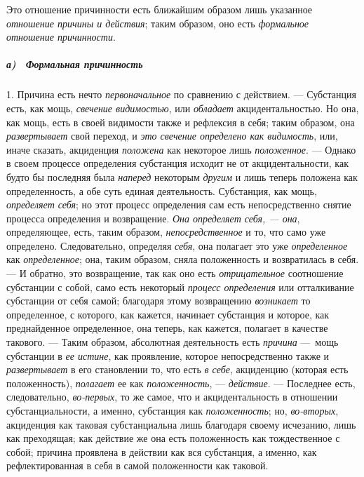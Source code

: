 Это отношение причинности есть ближайшим образом лишь указанное
{\em отношение причины и действия}; таким образом, оно
есть {\em формальное отношение причинности}.

\subparagraph[а) \ Формальная причинность]{а) \ Формальная причинность}
\hypertarget{Toc478978771}{}1. Причина есть нечто
{\em первоначальное} по сравнению с действием. —
Субстанция есть, как мощь, {\em свечение видимостью},
или {\em обладает} акцидентальностью. Но она, как мощь,
есть в своей видимости также и рефлексия в себя; таким образом, она
{\em развертывает} свой переход, и
{\em это свечение определено как видимость}, или, иначе
сказать, акциденция {\em положена} как некоторое лишь
{\em положенное}. — Однако в своем процессе определения
субстанция исходит не от акцидентальности, как будто бы последняя была
{\em наперед} некоторым
{\em другим} и лишь теперь положена как определенность,
а обе суть единая деятельность. Субстанция, как мощь,
{\em определяет себя}; но этот процесс определения сам
есть непосредственно снятие процесса определения и возвращение.
{\em Она определяет себя, — она}, определяющее, есть,
таким образом, {\em непосредственное} и то, что само
уже определено. Следовательно, определяя {\em себя},
она полагает это уже {\em определенное} как
{\em определенное}; она, таким образом, сняла
положенность и возвратилась в себя. — И обратно, это возвращение, так как
оно есть {\em отрицательное} соотношение субстанции с
собой, само есть некоторый {\em процесс определения}
или отталкивание субстанции от себя самой; благодаря этому возвращению
{\em возникает} то определенное, с которого, как
кажется, начинает субстанция и которое, как преднайденное определенное, она
теперь, как кажется, полагает в качестве такового. — Таким образом,
абсолютная деятельность есть {\em причина} —~мощь
субстанции в {\em ее истине}, как проявление, которое
непосредственно также и {\em развертывает} в его
становлении то, что есть {\em в себе}, акциденцию
(которая есть положенность), {\em полагает} ее как
{\em положенность}, —
{\em действие}. — Последнее есть, следовательно,
{\em во-первых}, то же самое, что и акцидентальность в
отношении субстанциальности, а именно, субстанция как
{\em положенность}; но,
{\em во-вторых}, акциденция как таковая субстанциальна
лишь благодаря своему исчезанию, лишь как преходящая; как действие же она
есть положенность как тождественное с собой; причина проявлена в действии
как вся субстанция, а именно, как рефлектированная в себя в самой
положенности как таковой.

